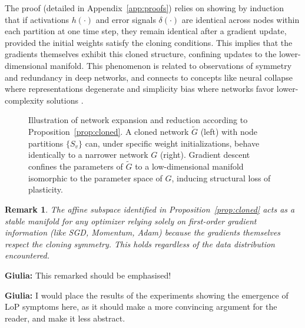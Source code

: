 \documentclass{article}
\newcommand{\giulia}[1]{{\color{ForestGreen}\textbf{Giulia:} #1}}
\newtheorem{remark}{Remark}[section]
\begin{document}

The proof (detailed in Appendix~\ref{app:proofs}) relies on showing by induction that if activations $h(\cdot)$ and error signals $\delta(\cdot)$ are identical across nodes within each partition at one time step, they remain identical after a gradient update, provided the initial weights satisfy the cloning conditions. This implies that the gradients themselves exhibit this cloned structure, confining updates to the lower-dimensional manifold. This phenomenon is related to observations of symmetry and redundancy in deep networks, and connects to concepts like neural collapse where representations degenerate \cite{papyan2020prevalence} and simplicity bias where networks favor lower-complexity solutions \cite{huh2022lowrank}.

\begin{figure}[t]
    \centering
    \resizebox{\textwidth}{!}{}
    \caption{Illustration of network expansion and reduction according to Proposition~\ref{prop:cloned}. A cloned network $\widetilde{G}$ (left) with node partitions $\{S_v\}$ can, under specific weight initializations, behave identically to a narrower network $G$ (right). Gradient descent confines the parameters of $\widetilde{G}$ to a low-dimensional manifold isomorphic to the parameter space of $G$, inducing structural loss of plasticity.}
    \label{fig:plasticity-manifolds}
\end{figure}

\begin{remark}
The affine subspace identified in Proposition~\ref{prop:cloned} acts as a stable manifold for any optimizer relying solely on first-order gradient information (like SGD, Momentum, Adam) because the gradients themselves respect the cloning symmetry. This holds regardless of the data distribution encountered.
\end{remark}
\giulia{This remarked should be emphasised!}

\giulia{I would place the results of the experiments showing the emergence of LoP symptoms here, as it should make a more convincing argument for the reader, and make it less abstract.}
\end{document}
